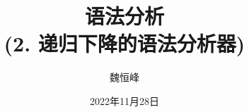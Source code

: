 \documentclass[]{beamer}
\title[语法分析]{语法分析 \\ (2. 递归下降的语法分析器)}
\author[魏恒峰]{\large 魏恒峰}
\institute{hfwei@nju.edu.cn}
\date{2022年11月28日}
\begin{document}
\maketitle



\thankyou{}

\end{document}
